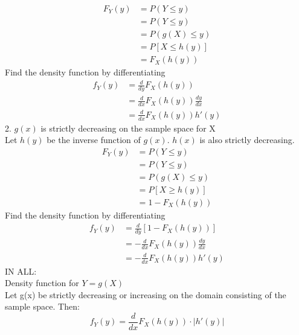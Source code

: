 \documentclass[10pt]{article}
\begin{document}
\begin{multicols}{2}
\begin{enumerate}
\begin{align*}
				F_Y(y) &= P(Y\le y)\\
				&= P(Y\le y)\\
				&= P(g(X) \le y)\\
				&= P[X \le h(y)]\\
				&= F_X(h(y))
			\end{align*}
			Find the density function by differentiating
			\begin{align*}
				f_Y(y) &= \frac{d}{dy}F_X(h(y))\\
				&= \frac{d}{dx}F_X(h(y))\frac{dy}{dx}\\
				&= \frac{d}{dx}F_X(h(y))h'(y)
			\end{align*}
			2. $g(x)$ is strictly decreasing on the sample space for X\\
			Let $h(y)$ be the inverse function of $g(x)$. $h(x)$ is also strictly decreasing.\\
			\begin{align*}
				F_Y(y) &= P(Y\le y)\\
				&= P(Y\le y)\\
				&= P(g(X) \le y)\\
				&= P[X \ge h(y)]\\
				&= 1 - F_X(h(y))
			\end{align*}
			Find the density function by differentiating
			\begin{align*}
				f_Y(y) &= \frac{d}{dy}[1-F_X(h(y))]\\
				&= -\frac{d}{dx}F_X(h(y))\frac{dy}{dx}\\
				&= -\frac{d}{dx}F_X(h(y))h'(y)
			\end{align*}
			IN ALL:\\
			Density function for $Y = g(X)$\\
			Let g(x) be strictly decreasing or increasing on the domain consisting of the sample space. Then:
			$$f_Y(y) = \frac{d}{dx}F_X(h(y)) \cdot |h'(y)|$$
		\end{enumerate}
	\newpage
	\end{multicols}
\end{document}
